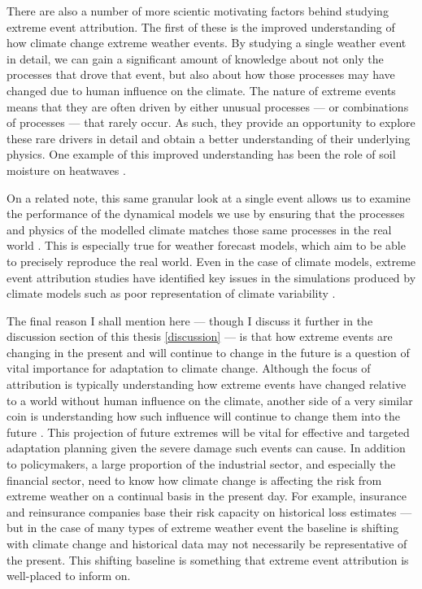   There are also a number of more scientic motivating factors behind studying extreme event attribution. The first of these is the improved understanding of how climate change extreme weather events. By studying a single weather event in detail, we can gain a significant amount of knowledge about not only the processes that drove that event, but also about how those processes may have changed due to human influence on the climate. The nature of extreme events means that they are often driven by either unusual processes --- or combinations of processes --- that rarely occur. As such, they provide an opportunity to explore these rare drivers in detail and obtain a better understanding of their underlying physics. One example of this improved understanding has been the role of soil moisture on heatwaves \citep{fischer_soil_2007,fischer_contribution_2007,wehrli_identifying_2019}. %

  On a related note, this same granular look at a single event allows us to examine the performance of the dynamical models we use by ensuring that the processes and physics of the modelled climate matches those same processes in the real world \citep{sillmann_understanding_2017,philip_protocol_2020}. This is especially true for weather forecast models, which aim to be able to precisely reproduce the real world. Even in the case of climate models, extreme event attribution studies have identified key issues in the simulations produced by climate models such as poor representation of climate variability \citep{bellprat_towards_2019,leach_anthropogenic_2020}.

  The final reason I shall mention here --- though I discuss it further in the discussion section of this thesis \ref{discussion} --- is that how extreme events are changing in the present and will continue to change in the future is a question of vital importance for adaptation to climate change. Although the focus of attribution is typically understanding how extreme events have changed relative to a world without human influence on the climate, another side of a very similar coin is understanding how such influence will continue to change them into the future \citep{harrington_integrating_2022}. This projection of future extremes will be vital for effective and targeted adaptation planning given the severe damage such events can cause. In addition to policymakers, a large proportion of the industrial sector, and especially the financial sector, need to know how climate change is affecting the risk from extreme weather on a continual basis in the present day. For example, insurance and reinsurance companies base their risk capacity on historical loss estimates --- but in the case of many types of extreme weather event the baseline is shifting with climate change and historical data may not necessarily be representative of the present. This shifting baseline is something that extreme event attribution is well-placed to inform on.

